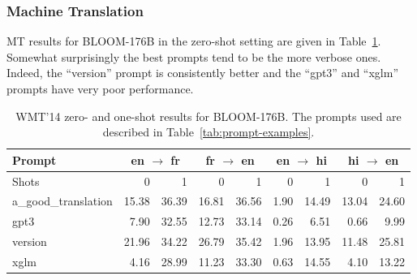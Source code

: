 \subsubsection{Machine Translation}
MT results for BLOOM-176B in the zero-shot setting are given in Table~\ref{tab:WMT-14enfr-byprompts-0shot}.
Somewhat surprisingly the best prompts tend to be the more verbose ones. Indeed, the ``version'' prompt is consistently better and the ``gpt3'' and ``xglm'' prompts have very poor performance. 

\begin{table}[ht!]
\centering\small
\addtolength{\tabcolsep}{-2.5pt}
\begin{tabular}{lrr|rr|rr|rr}
\toprule
Prompt & \multicolumn{2}{c}{en $\rightarrow$ fr} & \multicolumn{2}{c}{fr $\rightarrow$ en } & \multicolumn{2}{c}{en $\rightarrow$ hi} & \multicolumn{2}{c}{hi $\rightarrow$ en} \\
\midrule
Shots  & 0 & 1 & 0 & 1 & 0 & 1 & 0 & 1 \\
\midrule
a\_good\_translation & 15.38 & 36.39 & 16.81 &  36.56 & 1.90 & 14.49 & 13.04 & 24.60  \\
gpt3     & 7.90 & 32.55 & 12.73 & 33.14 & 0.26 & 6.51 & 0.66 & 9.99 \\
version  & 21.96 & 34.22 & 26.79 & 35.42 & 1.96 & 13.95 & 11.48 & 25.81 \\
xglm     & 4.16 & 28.99 & 11.23 & 33.30 & 0.63 & 14.55 & 4.10 & 13.22 \\
\bottomrule
\end{tabular}%
\caption{WMT'14 zero- and one-shot results for BLOOM-176B. The prompts used are described in Table~\ref{tab:prompt-examples}.}%
\label{tab:WMT-14enfr-byprompts-0shot}
\end{table}

